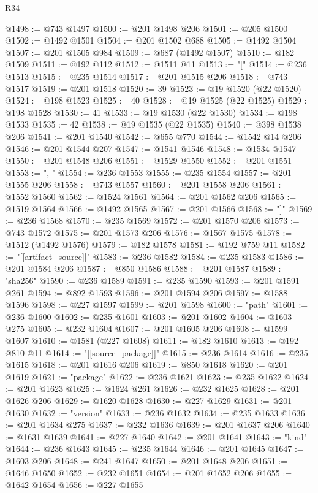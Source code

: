 \begin{lexlean}{R34}
\begin{coremodule}
@1498 := @743 @1497
@1500 := @201 @1498 @206
@1501 := @205 @1500
@1502 := @1492 @1501
@1504 := @201 @1502 @688
@1505 := @1492 @1504
@1507 := @201 @1505 @984
@1509 := @687 (@1492 @1507)
@1510 := @182 @1509
@1511 := @192 @112
@1512 := @1511 @11
@1513 := "["
@1514 := @236 @1513
@1515 := @235 @1514
@1517 := @201 @1515 @206
@1518 := @743 @1517
@1519 := @201 @1518
@1520 := 39
@1523 := @19 @1520 (@22 @1520)
@1524 := @198 @1523
@1525 := 40
@1528 := @19 @1525 (@22 @1525)
@1529 := @198 @1528
@1530 := 41
@1533 := @19 @1530 (@22 @1530)
@1534 := @198 @1533
@1535 := 42
@1538 := @19 @1535 (@22 @1535)
@1540 := @398 @1538 @206
@1541 := @201 @1540
@1542 := @655 @770
@1544 := @1542 @14 @206
@1546 := @201 @1544 @207
@1547 := @1541 @1546
@1548 := @1534 @1547
@1550 := @201 @1548 @206
@1551 := @1529 @1550
@1552 := @201 @1551
@1553 := ", "
@1554 := @236 @1553
@1555 := @235 @1554
@1557 := @201 @1555 @206
@1558 := @743 @1557
@1560 := @201 @1558 @206
@1561 := @1552 @1560
@1562 := @1524 @1561
@1564 := @201 @1562 @206
@1565 := @1519 @1564
@1566 := @1492 @1565
@1567 := @201 @1566
@1568 := "]"
@1569 := @236 @1568
@1570 := @235 @1569
@1572 := @201 @1570 @206
@1573 := @743 @1572
@1575 := @201 @1573 @206
@1576 := @1567 @1575
@1578 := @1512 (@1492 @1576)
@1579 := @182 @1578
@1581 := @192 @759 @11
@1582 := "[[artifact_source]]"
@1583 := @236 @1582
@1584 := @235 @1583
@1586 := @201 @1584 @206
@1587 := @850 @1586
@1588 := @201 @1587
@1589 := "sha256"
@1590 := @236 @1589
@1591 := @235 @1590
@1593 := @201 @1591 @261
@1594 := @892 @1593
@1596 := @201 @1594 @206
@1597 := @1588 @1596
@1598 := @227 @1597
@1599 := @201 @1598
@1600 := "path"
@1601 := @236 @1600
@1602 := @235 @1601
@1603 := @201 @1602
@1604 := @1603 @275
@1605 := @232 @1604
@1607 := @201 @1605 @206
@1608 := @1599 @1607
@1610 := @1581 (@227 @1608)
@1611 := @182 @1610
@1613 := @192 @810 @11
@1614 := "[[source_package]]"
@1615 := @236 @1614
@1616 := @235 @1615
@1618 := @201 @1616 @206
@1619 := @850 @1618
@1620 := @201 @1619
@1621 := "package"
@1622 := @236 @1621
@1623 := @235 @1622
@1624 := @201 @1623
@1625 := @1624 @261
@1626 := @232 @1625
@1628 := @201 @1626 @206
@1629 := @1620 @1628
@1630 := @227 @1629
@1631 := @201 @1630
@1632 := "version"
@1633 := @236 @1632
@1634 := @235 @1633
@1636 := @201 @1634 @275
@1637 := @232 @1636
@1639 := @201 @1637 @206
@1640 := @1631 @1639
@1641 := @227 @1640
@1642 := @201 @1641
@1643 := "kind"
@1644 := @236 @1643
@1645 := @235 @1644
@1646 := @201 @1645
@1647 := @1603 @206
@1648 := @241 @1647
@1650 := @201 @1648 @206
@1651 := @1646 @1650
@1652 := @232 @1651
@1654 := @201 @1652 @206
@1655 := @1642 @1654
@1656 := @227 @1655

\end{coremodule}
\end{lexlean}
